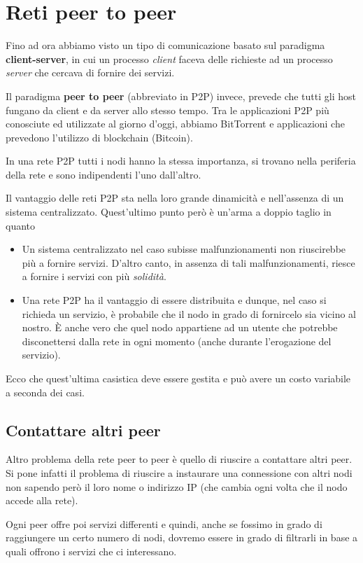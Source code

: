 \chapter{Reti peer to peer}
Fino ad ora abbiamo visto un tipo di comunicazione basato sul paradigma
\textbf{client-server}, in cui un processo \emph{client} faceva delle
richieste ad un processo \emph{server} che cercava di fornire dei
servizi.

Il paradigma \textbf{peer to peer} (abbreviato in P2P) invece, prevede 
che tutti gli host fungano da client e da server allo stesso tempo.
Tra le applicazioni P2P più conosciute ed utilizzate al giorno d'oggi,
abbiamo BitTorrent e applicazioni che prevedono l'utilizzo di 
blockchain (Bitcoin).

In una rete P2P tutti i nodi hanno la stessa importanza, si trovano
nella periferia della rete e sono indipendenti l'uno dall'altro.

Il vantaggio delle reti P2P sta nella loro grande dinamicità e 
nell'assenza di un sistema centralizzato. Quest'ultimo punto però è
un'arma a doppio taglio in quanto
\begin{itemize}
	\item Un sistema centralizzato nel caso subisse malfunzionamenti
		non riuscirebbe più a fornire servizi. D'altro canto, in 
		assenza di tali malfunzionamenti, riesce a fornire i servizi
		con più \emph{solidità}.
	\item Una rete P2P ha il vantaggio di essere distribuita e dunque,
		nel caso si richieda un servizio, è probabile che il nodo in
		grado di fornircelo sia vicino al nostro. \`E anche vero che
		quel nodo appartiene ad un utente che potrebbe disconettersi
		dalla rete in ogni momento (anche durante l'erogazione del
		servizio).
\end{itemize}
Ecco che quest'ultima casistica deve essere gestita e può avere un 
costo variabile a seconda dei casi.

\section{Contattare altri peer}
Altro problema della rete peer to peer è quello di riuscire a 
contattare altri peer. Si pone infatti il problema di riuscire a
instaurare una connessione con altri nodi non sapendo però il loro
nome o indirizzo IP (che cambia ogni volta che il nodo accede alla 
rete).

Ogni peer offre poi servizi differenti e quindi, anche se fossimo in
grado di raggiungere un certo numero di nodi, dovremo essere in grado
di filtrarli in base a quali offrono i servizi che ci interessano.

